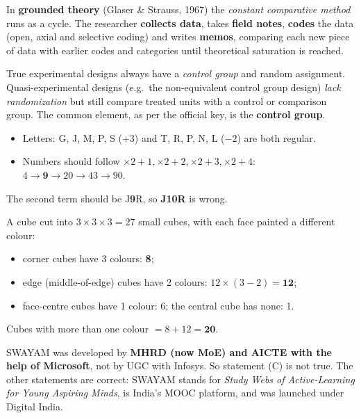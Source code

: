 In \textbf{grounded theory} (Glaser \& Strauss, 1967) the \emph{constant comparative method} runs as a cycle. The researcher \textbf{collects data}, takes \textbf{field notes}, \textbf{codes} the data (open, axial and selective coding) and writes \textbf{memos}, comparing each new piece of data with earlier codes and categories until theoretical saturation is reached.

True experimental designs always have a \emph{control group} and random assignment. Quasi-experimental designs (e.g.\ the non-equivalent control group design) \emph{lack randomization} but still compare treated units with a control or comparison group. The common element, as per the official key, is the \textbf{control group}.

\begin{itemize}
\item Letters: G, J, M, P, S (+3) and T, R, P, N, L ($-2$) are both regular.
\item Numbers should follow $\times2+1, \times2+2, \times2+3, \times2+4$: $4\rightarrow\mathbf{9}\rightarrow20\rightarrow43\rightarrow90$.
\end{itemize}
The second term should be J\textbf{9}R, so \textbf{J10R} is wrong.

A cube cut into $3\times3\times3=27$ small cubes, with each face painted a different colour:
\begin{itemize}
\item corner cubes have 3 colours: \textbf{8};
\item edge (middle-of-edge) cubes have 2 colours: $12\times(3-2)=\mathbf{12}$;
\item face-centre cubes have 1 colour: 6; the central cube has none: 1.
\end{itemize}
Cubes with more than one colour $=8+12=\mathbf{20}$.

SWAYAM was developed by \textbf{MHRD (now MoE) and AICTE with the help of Microsoft}, not by UGC with Infosys. So statement (C) is not true. The other statements are correct: SWAYAM stands for \emph{Study Webs of Active-Learning for Young Aspiring Minds}, is India's MOOC platform, and was launched under Digital India.

